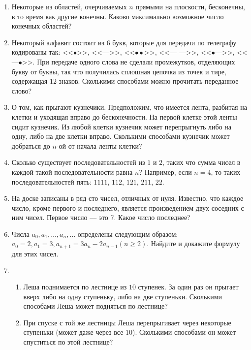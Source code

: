 \begin{enumerate}
\item Некоторые из областей, очерчиваемых $n$ прямыми на плоскости, бесконечны,
в то время как другие конечны. Каково максимально возможное число конечных областей?

\item Некоторый алфавит состоит из 6 букв, которые для передачи по телеграфу кодированы так:
<<$\bullet$>>, <<--->>, <<$\bullet\bullet$>>, <<--- --->>, <<$\bullet$--->>, <<---$\bullet$>>. При передаче одного слова не сделали промежутков, отделяющих букву от буквы, так что получилась сплошная цепочка из точек и тире, содержащая 12 знаков. Сколькими способами можно прочитать переданное слово? 

\item О том, как прыгают кузнечики. Предположим, что имеется лента, разбитая на клетки и уходящая вправо до бесконечности. На первой клетке этой ленты сидит кузнечик. Из любой клетки кузнечик может перепрыгнуть либо на одну, либо на две клетки вправо. Сколькими способами кузнечик может добраться до $n$-ой от начала ленты клетки? 

\item Сколько существует последовательностей из $1$ и $2$, таких что сумма чисел в каждой такой последовательности равна $n$? Например, если $n = 4$, то таких последовательностей пять:
$1111$, $112$, $121$, $211$, $22$.

\item На доске записаны в ряд сто чисел, отличных от нуля. Известно, что каждое число, кроме первого и последнего, является произведением двух соседних с ним чисел. Первое число –-- это $7$. Какое число последнее?

\item Числа $a_0, a_1, \ldots , a_n, \ldots$ определены следующим образом:
$a_0 = 2, a_1 = 3,  a_{n + 1} = 3a_n - 2a_{n - 1} (n \ge 2)$.
Найдите и докажите формулу для этих чисел. 

\item \begin{enumerate}
    \item Леша поднимается по лестнице из $10$ ступенек. За один раз он прыгает вверх либо на одну  
          ступеньку, либо на две ступеньки. Сколькими способами Леша может подняться по лестнице? 
    \item При спуске с той же лестницы Леша перепрыгивает через некоторые ступеньки (может даже 
          через все $10$). Сколькими способами он может спуститься по этой лестнице?
\end{enumerate}


\end{enumerate}
